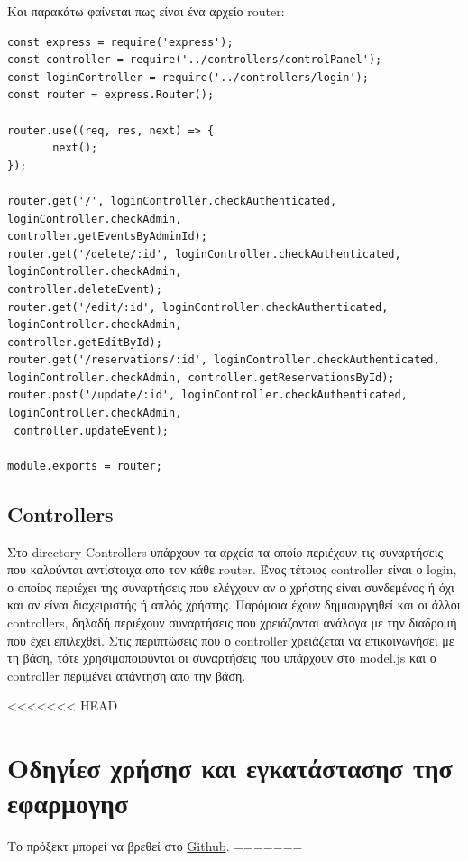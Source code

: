 \documentclass{acmart}
\begin{document}
Και παρακάτω φαίνεται πως είναι ένα αρχείο router:
\begin{lstlisting}
const express = require('express');
const controller = require('../controllers/controlPanel');
const loginController = require('../controllers/login');
const router = express.Router();

router.use((req, res, next) => {
       next();
});

router.get('/', loginController.checkAuthenticated, loginController.checkAdmin, 
controller.getEventsByAdminId);
router.get('/delete/:id', loginController.checkAuthenticated, loginController.checkAdmin, 
controller.deleteEvent);
router.get('/edit/:id', loginController.checkAuthenticated, loginController.checkAdmin, 
controller.getEditById);
router.get('/reservations/:id', loginController.checkAuthenticated, 
loginController.checkAdmin, controller.getReservationsById);
router.post('/update/:id', loginController.checkAuthenticated, loginController.checkAdmin, 
 controller.updateEvent);

module.exports = router;
\end{lstlisting}

\subsection*{Controllers}
Στο directory Controllers υπάρχουν τα αρχεία τα οποίο περιέχουν τις συναρτήσεις που καλούνται αντίστοιχα απο τον κάθε
router. Ένας τέτοιος controller είναι ο login, ο οποίος περιέχει της συναρτήσεις που ελέγχουν αν ο χρήστης είναι 
συνδεμένος ή όχι και αν είναι διαχειριστής ή απλός χρήστης. Παρόμοια έχουν δημιουργηθεί και οι άλλοι controllers, δηλαδή
περιέχουν συναρτήσεις που χρειάζονται ανάλογα με την διαδρομή που έχει επιλεχθεί.
Στις περιπτώσεις που ο controller χρειάζεται να επικοινωνήσει με τη βάση, τότε χρησιμοποιούνται οι συναρτήσεις που υπάρχουν 
στο model.js και ο controller περιμένει απάντηση απο την βάση.

<<<<<<< HEAD
\section{Οδηγίεσ χρήσησ και εγκατάστασησ τησ εφαρμογησ}
Το πρόξεκτ μπορεί να βρεθεί στο \href{https://github.com/KonstantoJr/web_dev_project}{Github}.
=======
\end{document}
